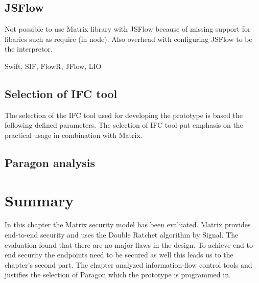 \subsection{JSFlow}
Not possible to use Matrix library with JSFlow because of missing support for libaries such as require (in node). Also overhead with configuring JSFlow to be the interpretor.

Swift, SIF, FlowR, JFlow, LIO


\subsection{Selection of IFC tool}
The selection of the IFC tool used for developing the prototype is based the following defined parameters.
The selection of IFC tool put emphasis on the practical usage in combination with Matrix. 

\subsection{Paragon analysis}


\section{Summary}
In this chapter the Matrix security model has been evaluated. Matrix provides end-to-end security and uses the Double Ratchet algorithm by Signal. The evaluation found that there are no major flaws in the design. To achieve end-to-end security the endpoints need to be secured as well \cite{Sabelfeld2003} this leads us to the chapter's second part. The chapter analyzed information-flow control tools and justifies the selection of Paragon which the prototype is programmed in. 